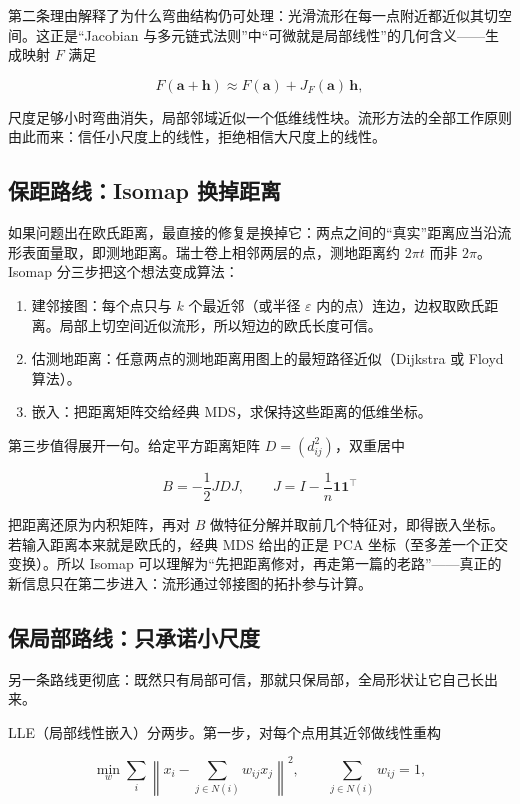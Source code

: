 第二条理由解释了为什么弯曲结构仍可处理：光滑流形在每一点附近都近似其切空间。这正是``Jacobian 与多元链式法则''中``可微就是局部线性''的几何含义——生成映射 \(F\) 满足

\[
F(\mathbf a+\mathbf h)
\approx F(\mathbf a)+J_F(\mathbf a)\,\mathbf h,
\]

尺度足够小时弯曲消失，局部邻域近似一个低维线性块。流形方法的全部工作原则由此而来：信任小尺度上的线性，拒绝相信大尺度上的线性。

\subsection{保距路线：Isomap 换掉距离}

如果问题出在欧氏距离，最直接的修复是换掉它：两点之间的``真实''距离应当沿流形表面量取，即测地距离。瑞士卷上相邻两层的点，测地距离约 \(2\pi t\) 而非 \(2\pi\)。Isomap 分三步把这个想法变成算法：

\begin{enumerate}
\def\labelenumi{\arabic{enumi}.}
\tightlist
\item
  建邻接图：每个点只与 \(k\) 个最近邻（或半径 \(\varepsilon\) 内的点）连边，边权取欧氏距离。局部上切空间近似流形，所以短边的欧氏长度可信。
\item
  估测地距离：任意两点的测地距离用图上的最短路径近似（Dijkstra 或 Floyd 算法）。
\item
  嵌入：把距离矩阵交给经典 MDS，求保持这些距离的低维坐标。
\end{enumerate}

第三步值得展开一句。给定平方距离矩阵 \(D=(d_{ij}^2)\)，双重居中

\[
B=-\frac12 JDJ,
\qquad
J=I-\frac1n\mathbf 1\mathbf 1^\top
\]

把距离还原为内积矩阵，再对 \(B\) 做特征分解并取前几个特征对，即得嵌入坐标。若输入距离本来就是欧氏的，经典 MDS 给出的正是 PCA 坐标（至多差一个正交变换）。所以 Isomap 可以理解为``先把距离修对，再走第一篇的老路''——真正的新信息只在第二步进入：流形通过邻接图的拓扑参与计算。

\subsection{保局部路线：只承诺小尺度}

另一条路线更彻底：既然只有局部可信，那就只保局部，全局形状让它自己长出来。

LLE（局部线性嵌入）分两步。第一步，对每个点用其近邻做线性重构

\[
\min_{w}\sum_i
\left\|x_i-\sum_{j\in N(i)}w_{ij}x_j\right\|^2,
\qquad
\sum_{j\in N(i)}w_{ij}=1,
\]

